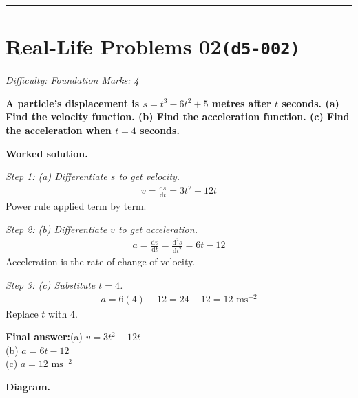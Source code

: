 \documentclass[11pt]{article}
\newcommand{\question}[1]{\par\medskip\noindent\textbf{#1}\par}
\begin{document}
\medskip\hrule

\section*{Real-Life Problems 02\quad\small\texttt{(d5-002)}}
\textit{Difficulty: Foundation \quad\textbar\quad Marks: 4}

\question{A particle's displacement is \( s = t^3 - 6t^2 + 5 \) metres after \( t \) seconds. (a) Find the velocity function. (b) Find the acceleration function. (c) Find the acceleration when \( t = 4 \) seconds.}

\textbf{Worked solution.}

\textit{Step 1: (a) Differentiate \( s \) to get velocity.}
\[\begin{gathered}
v = \frac{\mathrm{d}s}{\mathrm{d}t} = 3t^2 - 12t
\end{gathered}\]
Power rule applied term by term.

\textit{Step 2: (b) Differentiate \( v \) to get acceleration.}
\[\begin{gathered}
a = \frac{\mathrm{d}v}{\mathrm{d}t} = \frac{\mathrm{d}^2s}{\mathrm{d}t^2} = 6t - 12
\end{gathered}\]
Acceleration is the rate of change of velocity.

\textit{Step 3: (c) Substitute \( t = 4 \).}
\[\begin{gathered}
a = 6(4) - 12 = 24 - 12 = 12 \text{ ms}^{-2}
\end{gathered}\]
Replace \( t \) with 4.

\begin{answerbox}
\textbf{Final answer:}\quad (a) \(\displaystyle  v = 3t^2 - 12t \) \\[3pt]  (b) \(\displaystyle  a = 6t - 12 \) \\[3pt]  (c) \(\displaystyle  a = 12 \text{ ms}^{-2} \)
\end{answerbox}
\textbf{Diagram.}
\end{document}
